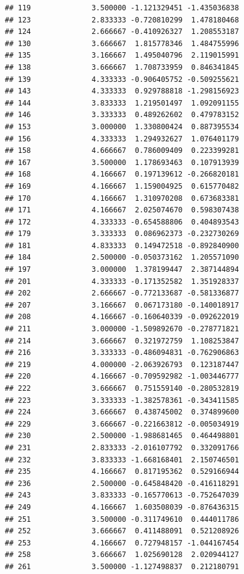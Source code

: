 \documentclass[
]{article}
\begin{document}
\begin{verbatim}
## 119              3.500000 -1.121329451 -1.435036838
## 123              2.833333 -0.720810299  1.478180468
## 124              2.666667 -0.410926327  1.208553187
## 130              3.666667  1.815778346  1.484755996
## 135              3.166667  1.495040796  2.119015991
## 138              3.666667  1.708733959  0.846341845
## 139              4.333333 -0.906405752 -0.509255621
## 143              4.333333  0.929788818 -1.298156923
## 144              3.833333  1.219501497  1.092091155
## 146              3.333333  0.489262602  0.479783152
## 153              3.000000  1.330800424  0.887395534
## 156              4.333333  1.294932627  1.076401179
## 158              4.666667  0.786009409  0.223399281
## 167              3.500000  1.178693463  0.107913939
## 168              4.166667  0.197139612 -0.266820181
## 169              4.166667  1.159004925  0.615770482
## 170              4.166667  1.310970208  0.673683381
## 171              4.166667  2.025074670  0.598307438
## 172              4.333333 -0.654588806  0.404893543
## 179              3.333333  0.086962373 -0.232730269
## 181              4.833333  0.149472518 -0.892840900
## 184              2.500000 -0.050373162  1.205571090
## 197              3.000000  1.378199447  2.387144894
## 201              4.333333 -0.171352582  1.351928337
## 202              2.666667 -0.772133687 -0.581336877
## 207              3.166667  0.067173180 -0.140018917
## 208              4.166667 -0.160640339 -0.092622019
## 211              3.000000 -1.509892670 -0.278771821
## 214              3.666667  0.321972759  1.108253847
## 216              3.333333 -0.486094831 -0.762906863
## 219              4.000000 -2.063926793  0.123187447
## 220              4.166667 -0.709592982 -1.003446777
## 222              3.666667  0.751559140 -0.280532819
## 223              3.333333 -1.382578361 -0.343411585
## 224              3.666667  0.438745002  0.374899600
## 229              3.666667 -0.221663812 -0.005034919
## 230              2.500000 -1.988681465  0.464498801
## 231              2.833333 -2.016107792  0.332091766
## 232              3.833333 -1.668168401  2.150746501
## 235              4.166667  0.817195362  0.529166944
## 236              2.500000 -0.645848420 -0.416118291
## 243              3.833333 -0.165770613 -0.752647039
## 249              4.166667  1.603508039 -0.876436315
## 251              3.500000 -0.311749610  0.444011786
## 252              3.666667  0.411488091  0.521208926
## 253              4.166667  0.727948157 -1.044167454
## 258              3.666667  1.025690128  2.020944127
## 261              3.500000 -1.127498837  0.212180791

\end{verbatim}
\end{document}
